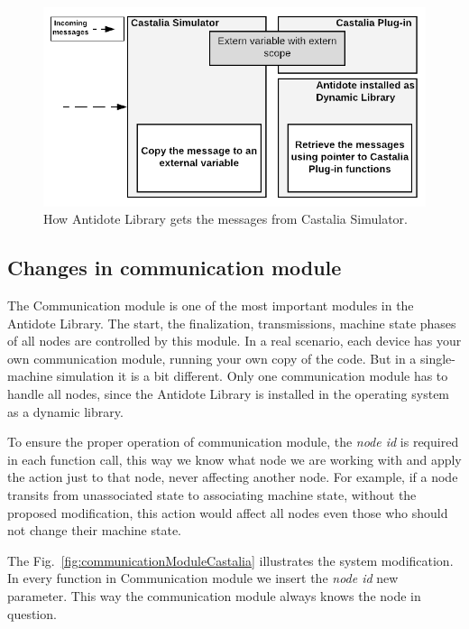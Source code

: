 \begin{figure}[htbp]
\centerline{\includegraphics[scale=0.35]{figures/castaliaPlugin.png}}
\caption{How Antidote Library gets the messages from Castalia Simulator.}
\label{fig:CastaliaPlugin}
\end{figure}

\subsection{Changes in communication module}

The Communication module is one of the most important modules in the Antidote Library. The start, the finalization, transmissions, machine state phases of all nodes are controlled by this module. In a real scenario, each device has your own communication module, running your own copy of the code. But in a single-machine simulation it is a bit different. Only one communication module has to handle all nodes, since the Antidote Library is installed in the operating system as a dynamic library.

To ensure the proper operation of communication module, the \textit{node id} is required in each function call, this way we know what node we are working with and apply the action just to that node, never affecting another node. For example, if a node transits from unassociated state to associating machine state, without the proposed modification, this action would affect all nodes even those who should not change their machine state.

The Fig.~\ref{fig:communicationModuleCastalia} illustrates the system modification. In every function in Communication module we insert the \textit{node id} new parameter. This way the communication module always knows the node in question. 

